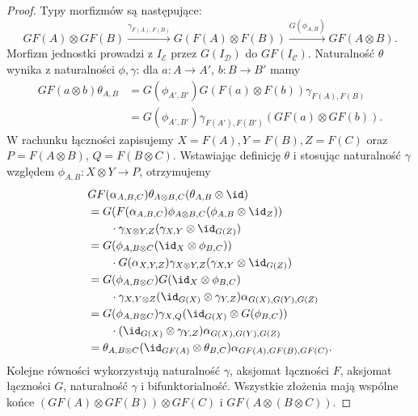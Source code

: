 \begin{proof}
Typy morfizmów są następujące:
\[
GF(A)\otimes GF(B)\xrightarrow{\gamma_{F(A),F(B)}}
G(F(A)\otimes F(B))\xrightarrow{G(\phi_{A,B})}GF(A\otimes B).
\]
Morfizm jednostki prowadzi z $I_{\mathcal E}$ przez $G(I_{\mathcal D})$ do $GF(I_{\mathcal C})$. Naturalność $\theta$ wynika z naturalności $\phi,\gamma$: dla $a:A\to A'$, $b:B\to B'$ mamy
\[
\begin{aligned}
GF(a\otimes b)\theta_{A,B}
&=G(\phi_{A',B'})G(F(a)\otimes F(b))\gamma_{F(A),F(B)}\\
&=G(\phi_{A',B'})\gamma_{F(A'),F(B')}(GF(a)\otimes GF(b)).
\end{aligned}
\]
W rachunku łączności zapisujemy $X=F(A),Y=F(B),Z=F(C)$ oraz $P=F(A\otimes B)$, $Q=F(B\otimes C)$. Wstawiając definicję $\theta$ i stosując naturalność $\gamma$ względem $\phi_{A,B}:X\otimes Y\to P$, otrzymujemy
\[
\begin{aligned}
&GF(\alpha_{A,B,C})\theta_{A\otimes B,C}(\theta_{A,B}\otimes\id)\\
&=G(F(\alpha_{A,B,C})\phi_{A\otimes B,C}(\phi_{A,B}\otimes\id_Z))\\
&\qquad{}\cdot\gamma_{X\otimes Y,Z}(\gamma_{X,Y}\otimes\id_{G(Z)})\\
&=G(\phi_{A,B\otimes C}(\id_X\otimes\phi_{B,C}))\\
&\qquad{}\cdot G(\alpha_{X,Y,Z})\gamma_{X\otimes Y,Z}(\gamma_{X,Y}\otimes\id_{G(Z)})\\
&=G(\phi_{A,B\otimes C})G(\id_X\otimes\phi_{B,C})\\
&\qquad{}\cdot\gamma_{X,Y\otimes Z}(\id_{G(X)}\otimes\gamma_{Y,Z})
\alpha_{G(X),G(Y),G(Z)}\\
&=G(\phi_{A,B\otimes C})\gamma_{X,Q}
(\id_{G(X)}\otimes G(\phi_{B,C}))\\
&\qquad{}\cdot(\id_{G(X)}\otimes\gamma_{Y,Z})\alpha_{G(X),G(Y),G(Z)}\\
&=\theta_{A,B\otimes C}(\id_{GF(A)}\otimes\theta_{B,C})
\alpha_{GF(A),GF(B),GF(C)}.
\end{aligned}
\]
Kolejne równości wykorzystują naturalność $\gamma$, aksjomat łączności $F$, aksjomat łączności $G$, naturalność $\gamma$ i bifunktorialność. Wszystkie złożenia mają wspólne końce $(GF(A)\otimes GF(B))\otimes GF(C)$ i $GF(A\otimes(B\otimes C))$.


\end{proof}

